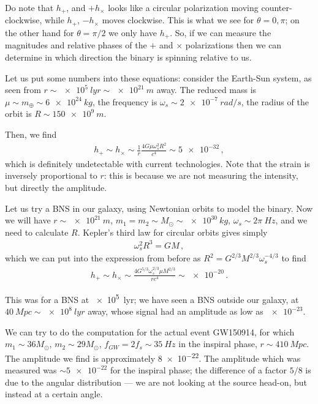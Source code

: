 \documentclass[main.tex]{subfiles}
\begin{document}
Do note that \(h_{+}\), and \(+ h_{ \times }\) looks like a circular polarization moving counter-clockwise, while \(h_{+}\), \(- h_{ \times }\) moves clockwise. This is what we see for \(\theta = 0, \pi \); on the other hand for \(\theta = \pi /2\) we only have \(h_{+}\). 
So, if we can measure the magnitudes and relative phases of the \(+\) and \(\times \) polarizations then we can determine in which direction the binary is spinning relative to us. 


Let us put some numbers into these equations: consider the Earth-Sun system, as seen from \(r \sim\SI{e5}{lyr} \sim \SI{e21}{m}\) away. The reduced mass is \(\mu \sim m_{\oplus} \sim \SI{6e24}{kg}\), the frequency is \(\omega_{s} \sim \SI{2e-7}{rad/s}\), the radius of the orbit is \(R \sim \SI{150e9}{m}\).

Then, we find 
%
\begin{align}
h_+ \sim h_{ \times } \sim \frac{1}{r}
\frac{4 G \mu \omega_{s}^2 R^2}{c^{4}} 
\sim \num{5e-32}
\,,
\end{align}
%
which is definitely undetectable with current technologies. 
Note that the strain is inversely proportional to \(r\): this is because we are not measuring the intensity, but directly the amplitude. 

Let us try a BNS in our galaxy, using Newtonian orbits to model the binary.
Now we will have \(r \sim \SI{e21}{m}\), \(m_1 = m_2 \sim M_{\odot} \sim \SI{e30}{kg}\), \(\omega_{s} \sim 2 \pi \SI{}{Hz}\), and we need to calculate \(R\).
Kepler's third law for circular orbits gives simply 
%
\begin{align}
\omega_{s}^2 R^3 = GM
\,,
\end{align}
%
which we can put into the expression from before as \(R^2 = G^{2/3} M^{2/3} \omega_{s}^{-4/3}\) to find 
%
\begin{align}
h_{+} \sim h_{ \times } \sim \frac{4 G^{5/3} \omega_{s}^{2/3} \mu M^{2/3}}{r c^{4}} \sim \num{e-20}
\,.
\end{align}


This was for a BNS at \SI{e5}{lyr};
we have seen a BNS outside our galaxy, at \(\SI{40}{Mpc} \sim \SI{e8}{lyr}\) away, whose signal had an amplitude as low as \(\num{e-23}\). 

We can try to do the computation for the actual event GW150914, for which \(m_1 \sim 36 M_{\odot}\), \(m_2 \sim 29 M_{\odot}\), \(f_{GW} = 2 f_s  \sim \SI{35}{Hz}\) in the inspiral phase, \(r \sim \SI{410}{Mpc}\).
The amplitude we find is approximately \num{8e-22}.
The amplitude which was measured was \(\sim \num{5e-22}\) \cite[fig.\ 2]{ligoscientificcollaborationandvirgocollaborationObservationGravitationalWaves2016} for the inspiral phase; the difference of a factor \(5/8\) is due to the angular distribution --- we are not looking at the source head-on, but instead at a certain angle.
\end{document}
